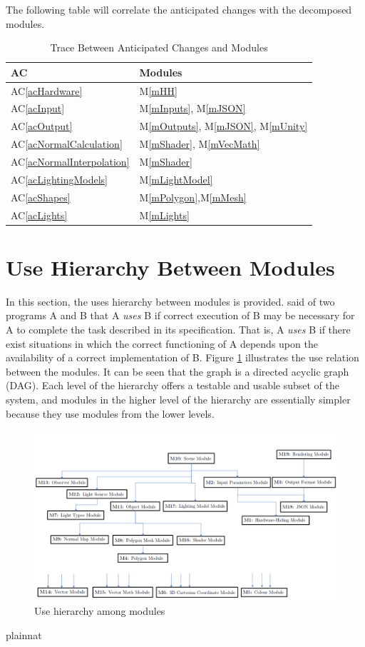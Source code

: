 \documentclass[12pt, titlepage]{article}
\newcommand{\acref}[1]{AC\ref{#1}}
\newcommand{\mref}[1]{M\ref{#1}}
\begin{document}
The following table will correlate the anticipated changes with the decomposed 
modules.
\begin{table}[H]
\centering
\begin{tabular}{p{} p{}}
\toprule
\textbf{AC} & \textbf{Modules}\\
\midrule
\acref{acHardware} & \mref{mHH}\\
\acref{acInput} & \mref{mInputs}, \mref{mJSON}\\
\acref{acOutput} & \mref{mOutputs}, \mref{mJSON}, \mref{mUnity}\\
\acref{acNormalCalculation} & \mref{mShader}, \mref{mVecMath}\\
\acref{acNormalInterpolation} & \mref{mShader}\\
\acref{acLightingModels} & \mref{mLightModel}\\
\acref{acShapes} & \mref{mPolygon},\mref{mMesh}\\
\acref{acLights} & \mref{mLights}\\

\bottomrule
\end{tabular}
\caption{Trace Between Anticipated Changes and Modules}
\label{TblACT}
\end{table}

\section{Use Hierarchy Between Modules} \label{SecUse}

In this section, the uses hierarchy between modules is
provided. \citet{Parnas1978} said of two programs A and B that A {\em uses} B if
correct execution of B may be necessary for A to complete the task described in
its specification. That is, A {\em uses} B if there exist situations in which
the correct functioning of A depends upon the availability of a correct
implementation of B.  Figure \ref{FigUH} illustrates the use relation between
the modules. It can be seen that the graph is a directed acyclic graph
(DAG). Each level of the hierarchy offers a testable and usable subset of the
system, and modules in the higher level of the hierarchy are essentially simpler
because they use modules from the lower levels.

\begin{figure}[H]
\includegraphics{mg-hierarchy}
\caption{Use hierarchy among modules}
\label{FigUH}
\end{figure}


 {plainnat}

\end{document}
